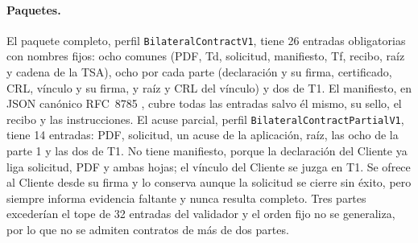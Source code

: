 \paragraph{Paquetes.} El paquete completo, perfil \texttt{BilateralContractV1},
tiene 26 entradas obligatorias con nombres fijos: ocho comunes (PDF, Td,
solicitud, manifiesto, Tf, recibo, raíz y cadena de la TSA), ocho por cada
parte (declaración y su firma, certificado, CRL, vínculo y su firma, y raíz y
CRL del vínculo) y dos de T1. El manifiesto, en JSON canónico RFC~8785
\cite{rundgren2020}, cubre todas las entradas salvo él mismo, su sello, el
recibo y las instrucciones. El acuse parcial, perfil
\texttt{BilateralContractPartialV1}, tiene 14 entradas: PDF, solicitud, un acuse
de la aplicación, raíz, las ocho de la parte 1 y las dos de T1. No tiene
manifiesto, porque la declaración del Cliente ya liga solicitud, PDF y ambas
hojas; el vínculo del Cliente se juzga en T1. Se ofrece al Cliente desde su
firma y lo conserva aunque la solicitud se cierre sin éxito, pero siempre
informa evidencia faltante y nunca resulta completo. Tres partes excederían el
tope de 32 entradas del validador y el orden fijo no se generaliza, por lo que
no se admiten contratos de más de dos partes.

